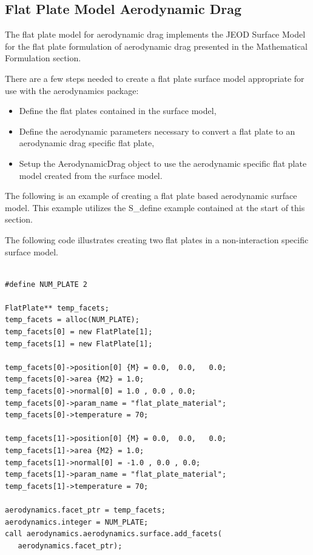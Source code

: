 \subsection{Flat Plate Model Aerodynamic Drag}

The flat plate model for aerodynamic drag implements the JEOD
Surface Model \cite{dynenv:SURFACEMODEL} for the flat plate formulation
of aerodynamic drag presented in the Mathematical Formulation section.

There are a few steps needed to create a flat plate surface model appropriate
for use with the aerodynamics package:

\begin{itemize}
\item{Define the flat plates contained in the surface model},
\item{Define the aerodynamic parameters necessary to convert a flat
plate to an aerodynamic drag specific flat plate},
\item{Setup the AerodynamicDrag object to use the aerodynamic specific
flat plate model created from the surface model}.
\end{itemize}

The following is an example of creating a flat plate based aerodynamic
surface model. This example utilizes the S\_define example contained
at the start of this section.

The following code illustrates creating two flat plates in a
non-interaction specific surface model.

\begin{verbatim}

#define NUM_PLATE 2

FlatPlate** temp_facets;
temp_facets = alloc(NUM_PLATE);
temp_facets[0] = new FlatPlate[1];
temp_facets[1] = new FlatPlate[1];

temp_facets[0]->position[0] {M} = 0.0,  0.0,   0.0;
temp_facets[0]->area {M2} = 1.0;
temp_facets[0]->normal[0] = 1.0 , 0.0 , 0.0;
temp_facets[0]->param_name = "flat_plate_material";
temp_facets[0]->temperature = 70;

temp_facets[1]->position[0] {M} = 0.0,  0.0,   0.0;
temp_facets[1]->area {M2} = 1.0;
temp_facets[1]->normal[0] = -1.0 , 0.0 , 0.0;
temp_facets[1]->param_name = "flat_plate_material";
temp_facets[1]->temperature = 70;

aerodynamics.facet_ptr = temp_facets;
aerodynamics.integer = NUM_PLATE;
call aerodynamics.aerodynamics.surface.add_facets(
   aerodynamics.facet_ptr);

\end{verbatim}

